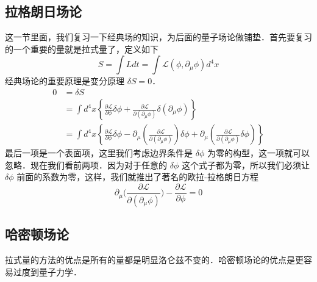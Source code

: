 


\subsection{拉格朗日场论}
这一节里面，我们复习一下经典场的知识，为后面的量子场论做铺垫．首先要复习的一个重要的量就是拉式量了，定义如下
\begin{equation}
S = \int L dt = \int \mathcal L(\phi,\partial_\mu \phi)d^4 x
\end{equation}
经典场论的重要原理是变分原理 $\delta S = 0$．
\begin{equation}
\begin{aligned}
0 &=\delta S \\
&=\int d^{4} x\left\{\frac{\partial \mathcal{L}}{\partial \phi} \delta \phi+\frac{\partial \mathcal{L}}{\partial\left(\partial_{\mu} \phi\right)} \delta\left(\partial_{\mu} \phi\right)\right\} \\
&=\int d^{4} x\left\{\frac{\partial \mathcal{L}}{\partial \phi} \delta \phi-\partial_{\mu}\left(\frac{\partial \mathcal{L}}{\partial\left(\partial_{\mu} \phi\right)}\right) \delta \phi+\partial_{\mu}\left(\frac{\partial \mathcal{L}}{\partial\left(\partial_{\mu} \phi\right)} \delta \phi\right)\right\}
\end{aligned}
\end{equation} 
最后一项是一个表面项，这里我们考虑边界条件是 $\delta \phi$ 为零的构型，这一项就可以忽略．现在我们看前两项．因为对于任意的 $\delta \phi$ 这个式子都为零，所以我们必须让 $\delta \phi$ 前面的系数为零，这样，我们就推出了著名的欧拉-拉格朗日方程
\begin{equation}
\partial_\mu \bigg( \frac{\partial \mathcal L}{\partial(\partial_\mu\phi)} \bigg) - \frac{\partial \mathcal L}{\partial \phi} = 0 
\end{equation}

\subsection{哈密顿场论}
拉式量的方法的优点是所有的量都是明显洛仑兹不变的．哈密顿场论的优点是更容易过度到量子力学．


